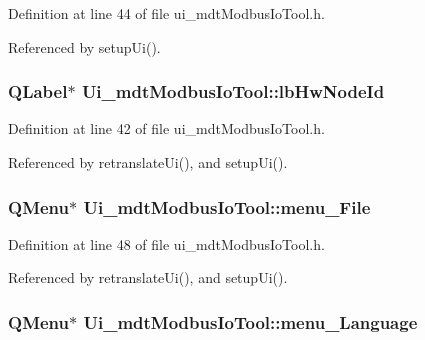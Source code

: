 Definition at line 44 of file ui\-\_\-mdt\-Modbus\-Io\-Tool.\-h.



Referenced by setup\-Ui().

\hypertarget{class_ui__mdt_modbus_io_tool_ac3edc57c24eb8f2d37e0374959fdffa7}{
\subsubsection[{lb\-Hw\-Node\-Id}]{\setlength{\rightskip}{0pt plus 5cm}Q\-Label$\ast$ Ui\-\_\-mdt\-Modbus\-Io\-Tool\-::lb\-Hw\-Node\-Id}}\label{class_ui__mdt_modbus_io_tool_ac3edc57c24eb8f2d37e0374959fdffa7}


Definition at line 42 of file ui\-\_\-mdt\-Modbus\-Io\-Tool.\-h.



Referenced by retranslate\-Ui(), and setup\-Ui().

\hypertarget{class_ui__mdt_modbus_io_tool_acfa5d67840ed8009e81284b8383cca18}{
\subsubsection[{menu\-\_\-\-File}]{\setlength{\rightskip}{0pt plus 5cm}Q\-Menu$\ast$ Ui\-\_\-mdt\-Modbus\-Io\-Tool\-::menu\-\_\-\-File}}\label{class_ui__mdt_modbus_io_tool_acfa5d67840ed8009e81284b8383cca18}


Definition at line 48 of file ui\-\_\-mdt\-Modbus\-Io\-Tool.\-h.



Referenced by retranslate\-Ui(), and setup\-Ui().

\hypertarget{class_ui__mdt_modbus_io_tool_a94583261b88e08ca386b793ff6133b0a}{
\subsubsection[{menu\-\_\-\-Language}]{\setlength{\rightskip}{0pt plus 5cm}Q\-Menu$\ast$ Ui\-\_\-mdt\-Modbus\-Io\-Tool\-::menu\-\_\-\-Language}}\label{class_ui__mdt_modbus_io_tool_a94583261b88e08ca386b793ff6133b0a}


